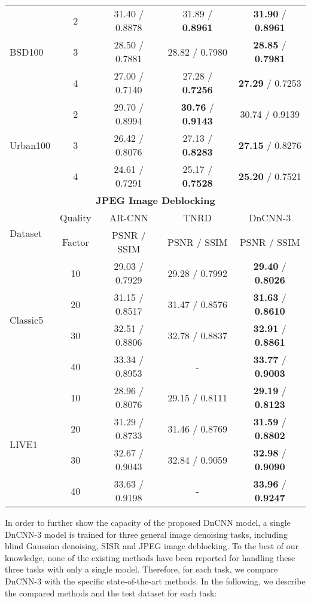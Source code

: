 \documentclass[journal]{IEEEtran}
\begin{document}
\begin{table}[!htbp]
\begin{tabular}{|l|c|c|c|c|}
    &2 & 31.40 / 0.8878 &  31.89 / \textbf{0.8961} & \textbf{31.90} / \textbf{0.8961}   \\
 BSD100 &3 & 28.50 / 0.7881 &  28.82 / 0.7980 &\textbf{28.85} / \textbf{0.7981} \\
  & 4 & 27.00 / 0.7140&  27.28 / \textbf{0.7256} &\textbf{27.29} / 0.7253  \\\hline

    &2 & 29.70 / 0.8994 &   \textbf{30.76} / \textbf{0.9143} &30.74 / 0.9139   \\
Urban100 &3 & 26.42 / 0.8076 &  27.13 / \textbf{0.8283} &\textbf{27.15} / 0.8276 \\
  & 4 & 24.61 / 0.7291 &  25.17 / \textbf{0.7528} &\textbf{25.20} / 0.7521  \\\hline \hline



   \multicolumn{5}{|c|}{\textbf{JPEG Image Deblocking}}    \\ \hline

 \multirow{2}{*}{Dataset} & Quality & AR-CNN & TNRD & DnCNN-3  \\
 \cline{3-5}
  & Factor & PSNR / SSIM & PSNR / SSIM & PSNR / SSIM  \\ \hline

 \multirow{4}{*}{Classic5} &10  &  29.03 / 0.7929&29.28 / 0.7992  & \textbf{29.40} / \textbf{0.8026}    \\
  &20 &  31.15 / 0.8517 &31.47 / 0.8576  & \textbf{31.63} / \textbf{0.8610}    \\
  &30 &  32.51 / 0.8806  &32.78 / 0.8837  & \textbf{32.91} / \textbf{0.8861}    \\
&40  &  33.34 / 0.8953 &- & \textbf{33.77} / \textbf{0.9003}  \\\hline

 \multirow{4}{*}{LIVE1}  &10 & 28.96 / 0.8076 &29.15 / 0.8111  & \textbf{29.19} / \textbf{0.8123}   \\
  &20 & 31.29 / 0.8733  &31.46 / 0.8769  & \textbf{31.59} / \textbf{0.8802}  \\
  &30  &  32.67 / 0.9043 &32.84 / 0.9059  & \textbf{32.98} / \textbf{0.9090}  \\
&40 &  33.63 / 0.9198  &- & \textbf{33.96} / \textbf{0.9247}   \\\hline

\end{tabular}
\label{tablem1}
\end{table}



In order to further show the capacity of the proposed DnCNN model, a single DnCNN-3 model is trained for three general image denoising tasks, including blind Gaussian denoising, SISR and JPEG image deblocking. To the best of our knowledge, none of the existing methods have been reported for handling these three tasks with only a single model. Therefore, for each task, we compare DnCNN-3 with the specific state-of-the-art methods. In the following, we describe the compared methods and the test dataset for each task:
\end{document}
